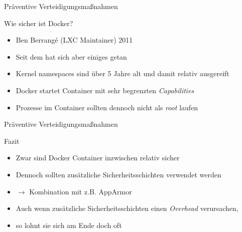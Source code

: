 \begin{frame}{Präventive Verteidigungsmaßnahmen}
        \begin{block}{Wie sicher ist Docker?}
                \begin{itemize}[<+->]
                        \item {} Ben Berrangé (LXC Maintainer) 2011\footnotemark
                        \item Seit dem hat sich aber einiges getan
                        \item Kernel namespaces sind über 5 Jahre alt und damit relativ ausgereift
                        \item Docker startet Container mit sehr begrenzten \textit{Capabilities}
                        \item Prozesse im Container sollten dennoch nicht als \textit{root} laufen
                \end{itemize}
        \end{block}

\end{frame}

\begin{frame}{Präventive Verteidigungsmaßnahmen}
        \begin{block}{Fazit}
                \begin{itemize}[<+->]
                        \item Zwar sind Docker Container inzwischen relativ sicher
                        \item Dennoch sollten zusätzliche Sicherheitsschichten verwendet werden
                        \item $\rightarrow$ Kombination mit z.B. AppArmor
                        \item Auch wenn zusätzliche Sicherheitsschichten einen \textit{Overhead} verursachen,
                        \item so lohnt sie sich am Ende doch oft 
                \end{itemize}
        \end{block}
\end{frame}

